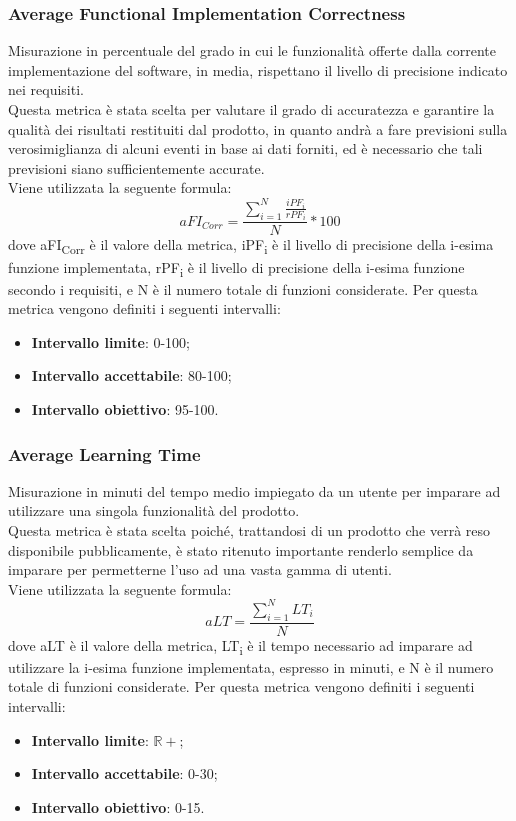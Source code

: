 \subsubsection{Average Functional Implementation Correctness}
Misurazione in percentuale del grado in cui le funzionalità offerte dalla corrente implementazione del software, in media, rispettano il livello di precisione indicato nei requisiti.\\
Questa metrica è stata scelta per valutare il grado di accuratezza e garantire la qualità dei risultati restituiti dal prodotto, in quanto andrà a fare previsioni sulla verosimiglianza di alcuni eventi in base ai dati forniti, ed è necessario che tali previsioni siano sufficientemente accurate.\\
Viene utilizzata la seguente formula:
$$aFI_{Corr}=\frac{\sum\limits_{i=1}^N\frac{iPF_i}{rPF_i}}{N}*100$$
dove aFI\textsubscript{Corr} è il valore della metrica, iPF\textsubscript{i} è il livello di precisione della i-esima funzione implementata, rPF\textsubscript{i} è il livello di precisione della i-esima funzione secondo i requisiti, e N è il numero totale di funzioni considerate.
Per questa metrica vengono definiti i seguenti intervalli: 
\begin{itemize}
	\item{\textbf{Intervallo limite}: 0-100;}
	\item{\textbf{Intervallo accettabile}: 80-100;}
	\item{\textbf{Intervallo obiettivo}: 95-100.}
\end{itemize}

\subsubsection{Average Learning Time}
Misurazione in minuti del tempo medio impiegato da un utente per imparare ad utilizzare una singola funzionalità del prodotto.
\\Questa metrica è stata scelta poiché, trattandosi di un prodotto che verrà reso disponibile pubblicamente, è stato ritenuto importante renderlo semplice da imparare per permetterne l'uso ad una vasta gamma di utenti.
\\Viene utilizzata la seguente formula:
$$aLT=\frac{\sum\limits_{i=1}^N{LT_i}}{N}$$
dove aLT è il valore della metrica, LT\textsubscript{i} è il tempo necessario ad imparare ad utilizzare la i-esima funzione implementata, espresso in minuti, e N è il numero totale di funzioni considerate.
Per questa metrica vengono definiti i seguenti intervalli: 
\begin{itemize}
	\item{\textbf{Intervallo limite}: $\mathbb{R+}$;}
	\item{\textbf{Intervallo accettabile}: 0-30;}
	\item{\textbf{Intervallo obiettivo}: 0-15.}
\end{itemize}

